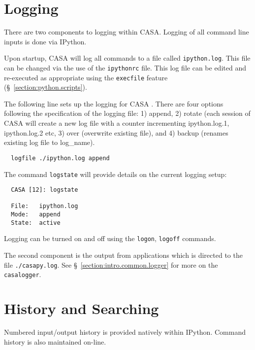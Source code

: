 \section{Logging}
\label{section:python.log}

There are two components to logging within CASA. Logging of all
command line inputs is done via IPython. 

Upon startup, CASA will log all commands to a file called
{\tt ipython.log}. This file can be changed via the use of the 
{\tt ipythonrc} file. 
This log file can be edited and
re-executed as appropriate using the 
{\tt execfile} feature (\S~\ref{section:python.scripts}).

The following line sets up the logging for CASA . There are four
options following the specification of the logging file: 1) append, 2)
rotate (each session of CASA will create a new log file with a counter
incrementing ipython.log.1, ipython.log.2 etc, 3) over (overwrite
existing file), and 4) backup (renames existing log file to log\_name).

\small
\begin{verbatim}
  logfile ./ipython.log append
\end{verbatim}
\normalsize

The command {\tt logstate} will provide details on the current logging setup:

\small
\begin{verbatim}
  CASA [12]: logstate

  File:   ipython.log
  Mode:   append
  State:  active
\end{verbatim}
\normalsize

Logging can be turned on and off using the {\tt logon}, {\tt logoff} commands.

The second component is the output from applications which is directed
to the file {\tt ./casapy.log}.  See \S~\ref{section:intro.common.logger}
for more on the {\tt casalogger}.

\section{History and Searching}
\label{section:python.hist}

Numbered input/output history is provided natively within
IPython. Command history is also maintained on-line. 

